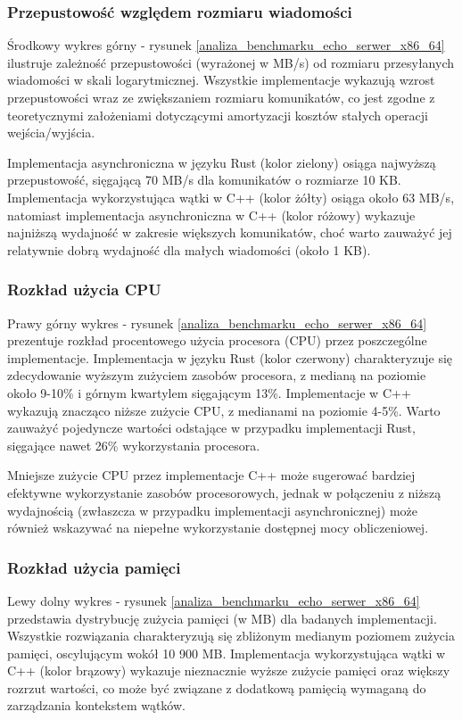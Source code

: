\subsubsection{ Przepustowość względem rozmiaru wiadomości}
Środkowy wykres górny - rysunek \ref{analiza_benchmarku_echo_serwer_x86_64} ilustruje zależność przepustowości (wyrażonej w MB/s) od rozmiaru przesyłanych wiadomości w skali logarytmicznej. Wszystkie implementacje wykazują wzrost przepustowości wraz ze zwiększaniem rozmiaru komunikatów, co jest zgodne z teoretycznymi założeniami dotyczącymi amortyzacji kosztów stałych operacji wejścia/wyjścia.

Implementacja asynchroniczna w języku Rust (kolor zielony) osiąga najwyższą przepustowość, sięgającą 70 MB/s dla komunikatów o rozmiarze 10 KB. Implementacja wykorzystująca wątki w C++ (kolor żółty) osiąga około 63 MB/s, natomiast implementacja asynchroniczna w C++ (kolor różowy) wykazuje najniższą wydajność w zakresie większych komunikatów, choć warto zauważyć jej relatywnie dobrą wydajność dla małych wiadomości (około 1 KB).

\subsubsection{Rozkład użycia CPU}
Prawy górny wykres - rysunek \ref{analiza_benchmarku_echo_serwer_x86_64} prezentuje rozkład procentowego użycia procesora (CPU) przez poszczególne implementacje. Implementacja w języku Rust (kolor czerwony) charakteryzuje się zdecydowanie wyższym zużyciem zasobów procesora, z medianą na poziomie około 9-10\% i górnym kwartylem sięgającym 13\%. Implementacje w C++ wykazują znacząco niższe zużycie CPU, z medianami na poziomie 4-5\%. Warto zauważyć pojedyncze wartości odstające w przypadku implementacji Rust, sięgające nawet 26\% wykorzystania procesora.

Mniejsze zużycie CPU przez implementacje C++ może sugerować bardziej efektywne wykorzystanie zasobów procesorowych, jednak w połączeniu z niższą wydajnością (zwłaszcza w przypadku implementacji asynchronicznej) może również wskazywać na niepełne wykorzystanie dostępnej mocy obliczeniowej.

\subsubsection{Rozkład użycia pamięci}
Lewy dolny wykres - rysunek \ref{analiza_benchmarku_echo_serwer_x86_64} przedstawia dystrybucję zużycia pamięci (w MB) dla badanych implementacji. Wszystkie rozwiązania charakteryzują się zbliżonym medianym poziomem zużycia pamięci, oscylującym wokół 10 900 MB. Implementacja wykorzystująca wątki w C++ (kolor brązowy) wykazuje nieznacznie wyższe zużycie pamięci oraz większy rozrzut wartości, co może być związane z dodatkową pamięcią wymaganą do zarządzania kontekstem wątków.

